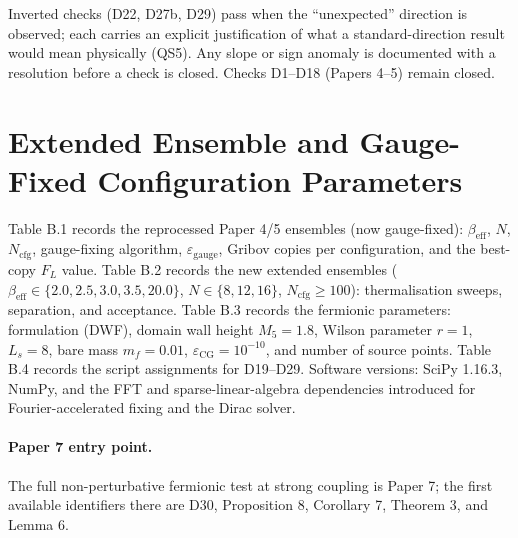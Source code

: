 \documentclass[11pt,a4paper]{article}
\theoremstyle{plain}
\theoremstyle{definition}
\theoremstyle{remark}
\newcommand{\be}{\beta_{\mathrm{eff}}}
\newcommand{\epsg}{\varepsilon_{\mathrm{gauge}}}
\newcommand{\FL}{F_{L}}
\newcommand{\Ncfg}{N_{\mathrm{cfg}}}
\begin{document}
\noindent
Inverted checks (D22, D27b, D29) pass when the ``unexpected'' direction is
observed; each carries an explicit justification of what a standard-direction
result would mean physically (QS5). Any slope or sign anomaly is documented
with a resolution before a check is closed. Checks D1--D18 (Papers 4--5)
remain closed.

\section{Extended Ensemble and Gauge-Fixed Configuration Parameters}
\label{app:ensembles}

Table B.1 records the reprocessed Paper 4/5 ensembles (now gauge-fixed):
$\be$, $N$, $\Ncfg$, gauge-fixing algorithm, $\epsg$, Gribov copies per
configuration, and the best-copy $\FL$ value. Table B.2 records the new
extended ensembles ($\be\in\{2.0,2.5,3.0,3.5,20.0\}$, $N\in\{8,12,16\}$,
$\Ncfg\ge100$): thermalisation sweeps, separation, and acceptance.
Table B.3 records the fermionic parameters: formulation (DWF), domain wall
height $M_5=1.8$, Wilson parameter $r=1$, $L_s=8$, bare mass $m_f=0.01$,
$\varepsilon_{\mathrm{CG}}=10^{-10}$, and number of source points.
Table B.4 records the script assignments for D19--D29. Software versions:
SciPy 1.16.3, NumPy, and the FFT and sparse-linear-algebra dependencies
introduced for Fourier-accelerated fixing and the Dirac solver.

\paragraph{Paper 7 entry point.}
The full non-perturbative fermionic test at strong coupling is Paper 7;
the first available identifiers there are D30, Proposition 8, Corollary 7,
Theorem 3, and Lemma 6.
\end{document}
